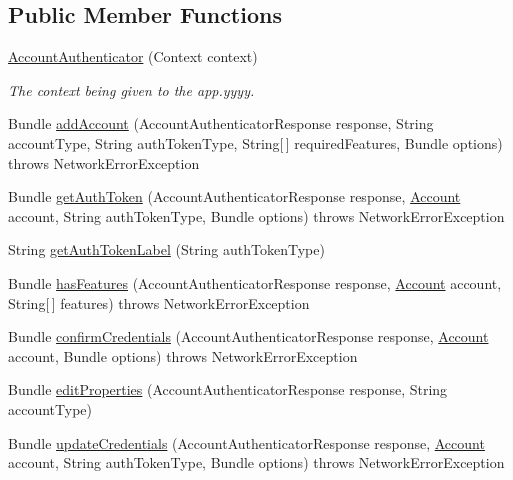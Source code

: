 \subsection*{Public Member Functions}
\begin{DoxyCompactItemize}
\item 
\hyperlink{classuk_1_1ac_1_1swan_1_1digitaltrails_1_1accounts_1_1_account_authenticator_a1c28ced91dd2f8a2079ba29e87eaed33}{Account\+Authenticator} (Context context)
\begin{DoxyCompactList}\small\item\em The context being given to the app.\+yyyy. \end{DoxyCompactList}\item 
Bundle \hyperlink{classuk_1_1ac_1_1swan_1_1digitaltrails_1_1accounts_1_1_account_authenticator_a62d040eea7e079506fbf38faf8a10910}{add\+Account} (Account\+Authenticator\+Response response, String account\+Type, String auth\+Token\+Type, String\mbox{[}$\,$\mbox{]} required\+Features, Bundle options)  throws Network\+Error\+Exception 
\item 
Bundle \hyperlink{classuk_1_1ac_1_1swan_1_1digitaltrails_1_1accounts_1_1_account_authenticator_accf8b092de90a407d819f2e725caa435}{get\+Auth\+Token} (Account\+Authenticator\+Response response, \hyperlink{classuk_1_1ac_1_1swan_1_1digitaltrails_1_1components_1_1_account}{Account} account, String auth\+Token\+Type, Bundle options)  throws Network\+Error\+Exception 
\item 
String \hyperlink{classuk_1_1ac_1_1swan_1_1digitaltrails_1_1accounts_1_1_account_authenticator_aed5266720e65fd505ae9e1b49e770321}{get\+Auth\+Token\+Label} (String auth\+Token\+Type)
\item 
Bundle \hyperlink{classuk_1_1ac_1_1swan_1_1digitaltrails_1_1accounts_1_1_account_authenticator_a5d57d1e4676178d3301498ab3f3f4878}{has\+Features} (Account\+Authenticator\+Response response, \hyperlink{classuk_1_1ac_1_1swan_1_1digitaltrails_1_1components_1_1_account}{Account} account, String\mbox{[}$\,$\mbox{]} features)  throws Network\+Error\+Exception 
\item 
Bundle \hyperlink{classuk_1_1ac_1_1swan_1_1digitaltrails_1_1accounts_1_1_account_authenticator_a89fd74d24bd17c1e4b491a1e6cb472cb}{confirm\+Credentials} (Account\+Authenticator\+Response response, \hyperlink{classuk_1_1ac_1_1swan_1_1digitaltrails_1_1components_1_1_account}{Account} account, Bundle options)  throws Network\+Error\+Exception 
\item 
Bundle \hyperlink{classuk_1_1ac_1_1swan_1_1digitaltrails_1_1accounts_1_1_account_authenticator_ad0fb9e2c65c901e2c60591943b25a0a4}{edit\+Properties} (Account\+Authenticator\+Response response, String account\+Type)
\item 
Bundle \hyperlink{classuk_1_1ac_1_1swan_1_1digitaltrails_1_1accounts_1_1_account_authenticator_a2b9b07cf976fa45eda1380afe84c3b84}{update\+Credentials} (Account\+Authenticator\+Response response, \hyperlink{classuk_1_1ac_1_1swan_1_1digitaltrails_1_1components_1_1_account}{Account} account, String auth\+Token\+Type, Bundle options)  throws Network\+Error\+Exception 
\end{DoxyCompactItemize}
